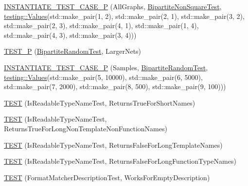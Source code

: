 \begin{DoxyCompactItemize}
\item 
\mbox{\hyperlink{namespacetesting_1_1gmock__matchers__test_a64ef722e930c3088ddea704ac20194b5}{I\+N\+S\+T\+A\+N\+T\+I\+A\+T\+E\+\_\+\+T\+E\+S\+T\+\_\+\+C\+A\+S\+E\+\_\+P}} (All\+Graphs, \mbox{\hyperlink{classtesting_1_1gmock__matchers__test_1_1BipartiteNonSquareTest}{Bipartite\+Non\+Square\+Test}}, \mbox{\hyperlink{namespacetesting_a8209ef59db08b8ad4beed30d8d6e6a88}{testing\+::\+Values}}(std\+::make\+\_\+pair(1, 2), std\+::make\+\_\+pair(2, 1), std\+::make\+\_\+pair(3, 2), std\+::make\+\_\+pair(2, 3), std\+::make\+\_\+pair(4, 1), std\+::make\+\_\+pair(1, 4), std\+::make\+\_\+pair(4, 3), std\+::make\+\_\+pair(3, 4)))
\item 
\mbox{\hyperlink{namespacetesting_1_1gmock__matchers__test_ace6351a5a34b746491458140b06534ed}{T\+E\+S\+T\+\_\+P}} (\mbox{\hyperlink{classtesting_1_1gmock__matchers__test_1_1BipartiteRandomTest}{Bipartite\+Random\+Test}}, Larger\+Nets)
\item 
\mbox{\hyperlink{namespacetesting_1_1gmock__matchers__test_a857f48ffb1fc6f5ce61aec79b5c94da8}{I\+N\+S\+T\+A\+N\+T\+I\+A\+T\+E\+\_\+\+T\+E\+S\+T\+\_\+\+C\+A\+S\+E\+\_\+P}} (Samples, \mbox{\hyperlink{classtesting_1_1gmock__matchers__test_1_1BipartiteRandomTest}{Bipartite\+Random\+Test}}, \mbox{\hyperlink{namespacetesting_a8209ef59db08b8ad4beed30d8d6e6a88}{testing\+::\+Values}}(std\+::make\+\_\+pair(5, 10000), std\+::make\+\_\+pair(6, 5000), std\+::make\+\_\+pair(7, 2000), std\+::make\+\_\+pair(8, 500), std\+::make\+\_\+pair(9, 100)))
\item 
\mbox{\hyperlink{namespacetesting_1_1gmock__matchers__test_aef0bf5f855b1e75c63ec45408b5a23ba}{T\+E\+ST}} (Is\+Readable\+Type\+Name\+Test, Returns\+True\+For\+Short\+Names)
\item 
\mbox{\hyperlink{namespacetesting_1_1gmock__matchers__test_a839515535e3e75d4f80ba6ae8f7347ec}{T\+E\+ST}} (Is\+Readable\+Type\+Name\+Test, Returns\+True\+For\+Long\+Non\+Template\+Non\+Function\+Names)
\item 
\mbox{\hyperlink{namespacetesting_1_1gmock__matchers__test_ad1630d47de9f4fcdc00ab4962eaeea05}{T\+E\+ST}} (Is\+Readable\+Type\+Name\+Test, Returns\+False\+For\+Long\+Template\+Names)
\item 
\mbox{\hyperlink{namespacetesting_1_1gmock__matchers__test_a30516b1c70e14132d1d87ab08b96aa2f}{T\+E\+ST}} (Is\+Readable\+Type\+Name\+Test, Returns\+False\+For\+Long\+Function\+Type\+Names)
\item 
\mbox{\hyperlink{namespacetesting_1_1gmock__matchers__test_ae104f652fab7d1b3c3873f6987401481}{T\+E\+ST}} (Format\+Matcher\+Description\+Test, Works\+For\+Empty\+Description)

\end{DoxyCompactItemize}

